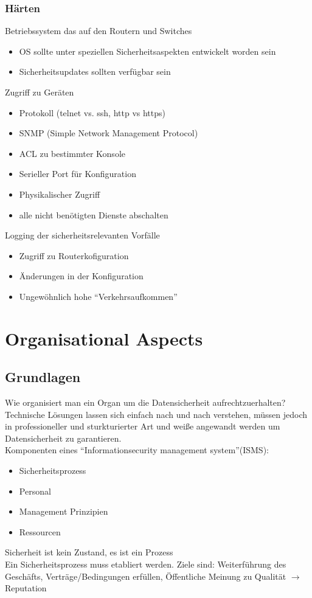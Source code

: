 \documentclass{article} %
\begin{document}
\subsubsection{Härten}
Betriebssystem das auf den Routern und Switches
\begin{itemize}
	\item OS sollte unter speziellen Sicherheitsaspekten entwickelt worden sein
    \item Sicherheitsupdates sollten verfügbar sein
\end{itemize}
Zugriff zu Geräten
\begin{itemize}
	\item Protokoll (telnet vs. ssh, http vs https)
    \item SNMP (Simple Network Management Protocol)
    \item ACL zu bestimmter Konsole
    \item Serieller Port für Konfiguration
    \item Physikalischer Zugriff
    \item alle nicht benötigten Dienste abschalten
\end{itemize}
Logging der sicherheitsrelevanten Vorfälle
\begin{itemize}
	\item Zugriff zu Routerkofiguration
    \item Änderungen in der Konfiguration
    \item Ungewöhnlich hohe "`Verkehrsaufkommen"'
\end{itemize}
\section{Organisational Aspects}
\subsection{Grundlagen}
Wie organisiert man ein Organ um die Datensicherheit aufrechtzuerhalten?\\
Technische Lösungen lassen sich einfach nach und nach verstehen, müssen jedoch in professioneller und sturkturierter Art und weiße angewandt werden um Datensicherheit zu garantieren.\\
Komponenten eines "`Informationsecurity management system"'(ISMS):
\begin{itemize}
	\item Sicherheitsprozess
    \item Personal
    \item Management Prinzipien
    \item Ressourcen
\end{itemize}
Sicherheit ist kein Zustand, es ist ein Prozess\\
Ein Sicherheitsprozess muss etabliert werden. Ziele sind: Weiterführung des Geschäfts, Verträge/Bedingungen erfüllen, Öffentliche Meinung zu Qualität $\rightarrow$ Reputation
\end{document}
